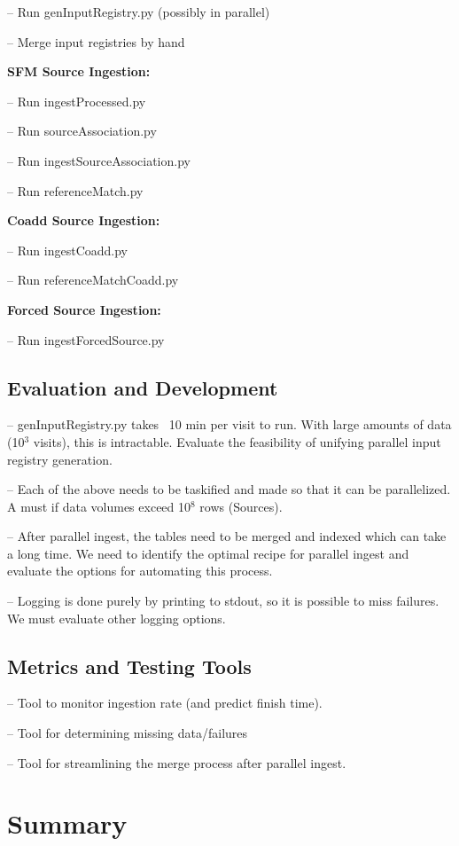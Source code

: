 \documentclass[prd, nofootinbib, floatfix, 11pt,tightenlines,times]{article}
\begin{document}
-- Run genInputRegistry.py (possibly in parallel)

-- Merge input registries by hand

{\bf SFM Source Ingestion:}

-- Run ingestProcessed.py

-- Run sourceAssociation.py

-- Run ingestSourceAssociation.py

-- Run referenceMatch.py

{\bf Coadd Source Ingestion:}

-- Run ingestCoadd.py

-- Run referenceMatchCoadd.py

{\bf Forced Source Ingestion:}

-- Run ingestForcedSource.py

\subsection{Evaluation and Development}
-- genInputRegistry.py takes ~10 min per visit to run.  With large
amounts of data (10$^3$ visits), this is intractable.  Evaluate the
feasibility of unifying parallel input registry generation.

-- Each of the above needs to be taskified and made so that it can be
parallelized.  A must if data volumes exceed 10$^{8}$ rows (Sources).

-- After parallel ingest, the tables need to be merged and indexed
which can take a long time.  We need to identify the optimal recipe
for parallel ingest and evaluate the options for automating this
process.

-- Logging is done purely by printing to stdout, so it is possible to
miss failures.  We must evaluate other logging options.

\subsection{Metrics and Testing Tools}

-- Tool to monitor ingestion rate (and predict finish time).

-- Tool for determining missing data/failures

-- Tool for streamlining the merge process after parallel ingest.


\section{Summary} 
\end{document}
